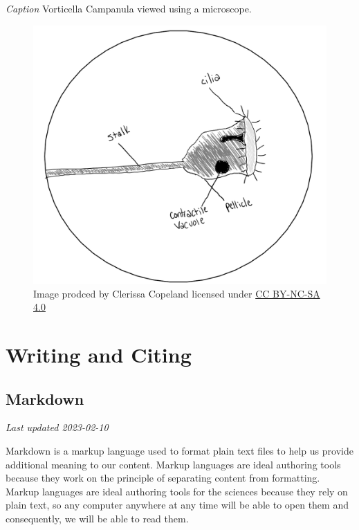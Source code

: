 \documentclass[
]{book}
\begin{document}
\emph{Caption} Vorticella Campanula viewed using a microscope.

\begin{figure}
\centering
\includegraphics{images/JSSG_poor-journal-style-fig-1.png}
\caption{Image prodced by Clerissa Copeland licensed under \href{https://creativecommons.org/licenses/by-nc-sa/4.0/}{CC BY-NC-SA 4.0}}
\end{figure}

\hypertarget{part-writing-and-citing}{%
\part*{Writing and Citing}\label{part-writing-and-citing}}

\hypertarget{markdown-1}{%
\chapter{Markdown}\label{markdown-1}}

\emph{Last updated 2023-02-10}

Markdown is a markup language used to format plain text files to help us provide additional meaning to our content. Markup languages are ideal authoring tools because they work on the principle of separating content from formatting. Markup languages are ideal authoring tools for the sciences because they rely on plain text, so any computer anywhere at any time will be able to open them and consequently, we will be able to read them.
\end{document}

